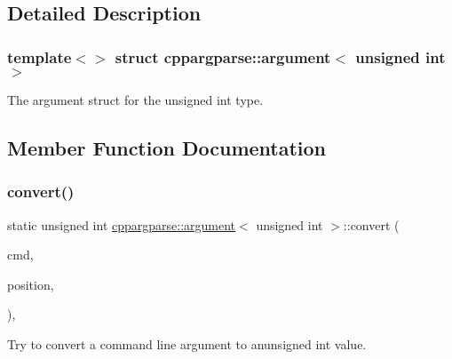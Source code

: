 \subsection{Detailed Description}
\subsubsection*{template$<$$>$\newline
struct cppargparse\+::argument$<$ unsigned int $>$}

The argument struct for the unsigned int type. 

\subsection{Member Function Documentation}
\mbox{\label{structcppargparse_1_1argument_3_01unsigned_01int_01_4_ab236112ad1382650862c2f4ee700ed4d}} 
\subsubsection{\texorpdfstring{convert()}{convert()}}
{\footnotesize\ttfamily static unsigned int \hyperlink{structcppargparse_1_1argument}{cppargparse\+::argument}$<$ unsigned int $>$\+::convert (\begin{DoxyParamCaption}\item[{const \hyperlink{types_8h_a80adf2418b7ce9fe616698efa7533ecf}{types\+::\+Command\+Line\+\_\+t} \&}]{cmd,  }\item[{const \hyperlink{types_8h_a43b4f43f8940de1bf09ced6f1b668053}{types\+::\+Command\+Line\+Position\+\_\+t} \&}]{position,  }\item[{const \hyperlink{types_8h_a003c660afe2ee9c6cc39aea966e8926d}{types\+::\+Command\+Line\+Arguments\+\_\+t} \&}]{ }\end{DoxyParamCaption})\hspace{0.3cm}{\ttfamily [inline]}, {\ttfamily [static]}}



Try to convert a command line argument to anunsigned int value. 


